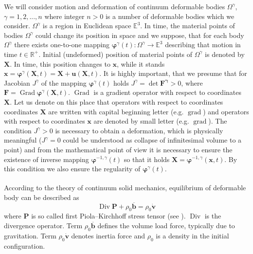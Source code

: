 \documentclass{article}
\begin{document}
   We will consider motion and deformation of continuum deformable bodies $ \Omega^{\gamma} $, $\gamma = 1,2,...,n$ where integer $ n>0 $  is a number of deformable bodies which we consider. $\Omega^{\gamma}$ is a region in Euclidean space $\mathbb{E}^{3}$. In time, the material points of bodies $ \Omega^{\gamma} $ could change its position in space and we suppose, that for each body $ \Omega^{\gamma} $ there exists one-to-one mapping $\bm{\varphi}^{\gamma}(t) : \Omega^{\gamma} \longrightarrow \mathbb{E}^{3}$ describing that motion in time $t \in \mathbb{R}^{+}$. Initial (undeformed) position of material points of $ \Omega^{\gamma} $ is denoted by $ \mathbf{X} $. In time, this position changes to $ \mathbf{x} $, while it stands $\mathbf{x}=\bm{\varphi}^{\gamma}(\mathbf{X}, t) = \mathbf{X}+\mathbf{u}(\mathbf{X}, t)$. It is highly important, that we presume that for Jacobian $ J^{\gamma} $ of the mapping $\bm{\varphi}^{\gamma}(t)$ holds $J^{\gamma}=\operatorname{det} \mathbf{F^{\gamma}} > 0$, where $\mathbf{F}=\operatorname{Grad} \bm{\varphi}^{\gamma}(\mathbf{X}, t)$. $ \operatorname{Grad} $ is a gradient operator with respect to coordinates $ \mathbf{X} $. Let us denote on this place that operators with respect to coordinates coordinates $ \mathbf{X} $ are written with capital beginning letter (e.g. $ \operatorname{grad} $) and operators with respect to coordinates $ \mathbf{x} $ are denoted by small letter (e.g. $ \operatorname{grad} $). The condition $J^{\gamma} > 0$ is necessary to obtain a deformation, which is physically meaningful ($ J^{\gamma} = 0 $ could be understood as collapse of infinitesimal volume to a point) and from the mathematical point of view it is necessary to ensure the existence of inverse mapping $ \bm{\varphi}^{-1,\gamma}(t) $ so that it holds $\mathbf{X}=\bm{\varphi}^{-1,\gamma}(\mathbf{x},t)$. By this condition we also ensure the regularity of $ \bm{\varphi}^{\gamma}(t) $. 
\\
\\
According to the theory of continuum solid mechanics, equilibrium of deformable body can be described as
\begin{equation}\label{1}
\operatorname{Div} \mathbf{P}+\rho_{0} \mathbf{\overline{b}}=\rho_{0} \dot{\mathbf{v}}
\end{equation}
where $ \mathbf{P} $ is so called first Piola–Kirchhoff stress tensor (see \cite[Chapter 2, p.28]{Wriggers}). $ \operatorname{Div} $ is the divergence operator. Term $ \rho_{0} \mathbf{\overline{b}} $ defines the volume load force, typically due to gravitation. Term $ \rho_{0} \dot{\mathbf{v}} $ denotes inertia force and $ \rho_{0} $ is a density in the initial configuration. 
\end{document}
